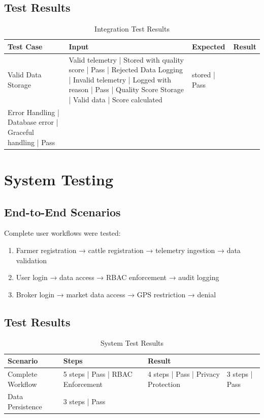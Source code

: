 \subsection{Test Results}

\begin{table}[H]
\centering
\begin{tabular}{|l|l|l|l|}
\hline
\textbf{Test Case} & \textbf{Input} & \textbf{Expected} & \textbf{Result} \\
\hline
Valid Data Storage & Valid telemetry | Stored with quality score | Pass |
Rejected Data Logging | Invalid telemetry | Logged with reason | Pass |
Quality Score Storage | Valid data | Score calculated & stored | Pass \\
Error Handling | Database error | Graceful handling | Pass \\
\hline
\end{tabular}
\caption{Integration Test Results}
\end{table}

\section{System Testing}

\subsection{End-to-End Scenarios}

Complete user workflows were tested:

\begin{enumerate}
    \item Farmer registration → cattle registration → telemetry ingestion → data validation
    \item User login → data access → RBAC enforcement → audit logging
    \item Broker login → market data access → GPS restriction → denial
\end{enumerate}

\subsection{Test Results}

\begin{table}[H]
\centering
\begin{tabular}{|l|l|l|l|}
\hline
\textbf{Scenario} & \textbf{Steps} & \textbf{Result} \\
\hline
Complete Workflow & 5 steps | Pass |
RBAC Enforcement & 4 steps | Pass |
Privacy Protection & 3 steps | Pass \\
Data Persistence & 3 steps | Pass \\
\hline
\end{tabular}
\caption{System Test Results}
\end{table}

